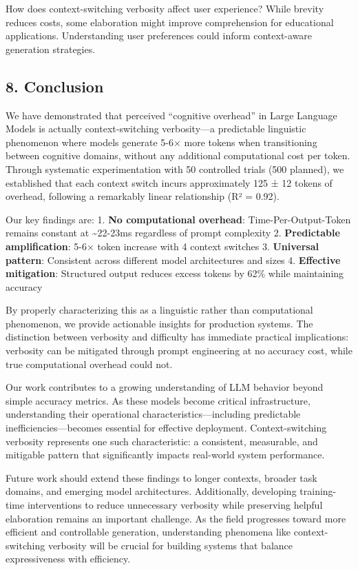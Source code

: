 \documentclass[
  11pt]{article}
\begin{document}
How does context-switching verbosity affect user experience? While
brevity reduces costs, some elaboration might improve comprehension for
educational applications. Understanding user preferences could inform
context-aware generation strategies.

\subsection{8. Conclusion}\label{conclusion}

We have demonstrated that perceived ``cognitive overhead'' in Large
Language Models is actually context-switching verbosity---a predictable
linguistic phenomenon where models generate 5-6× more tokens when
transitioning between cognitive domains, without any additional
computational cost per token. Through systematic experimentation with 50
controlled trials (500 planned), we established that each context switch
incurs approximately 125 ± 12 tokens of overhead, following a remarkably
linear relationship (R² = 0.92).

Our key findings are: 1. \textbf{No computational overhead}:
Time-Per-Output-Token remains constant at \textasciitilde22-23ms
regardless of prompt complexity 2. \textbf{Predictable amplification}:
5-6× token increase with 4 context switches 3. \textbf{Universal
pattern}: Consistent across different model architectures and sizes 4.
\textbf{Effective mitigation}: Structured output reduces excess tokens
by 62\% while maintaining accuracy

By properly characterizing this as a linguistic rather than
computational phenomenon, we provide actionable insights for production
systems. The distinction between verbosity and difficulty has immediate
practical implications: verbosity can be mitigated through prompt
engineering at no accuracy cost, while true computational overhead could
not.

Our work contributes to a growing understanding of LLM behavior beyond
simple accuracy metrics. As these models become critical infrastructure,
understanding their operational characteristics---including predictable
inefficiencies---becomes essential for effective deployment.
Context-switching verbosity represents one such characteristic: a
consistent, measurable, and mitigable pattern that significantly impacts
real-world system performance.

Future work should extend these findings to longer contexts, broader
task domains, and emerging model architectures. Additionally, developing
training-time interventions to reduce unnecessary verbosity while
preserving helpful elaboration remains an important challenge. As the
field progresses toward more efficient and controllable generation,
understanding phenomena like context-switching verbosity will be crucial
for building systems that balance expressiveness with efficiency.
\end{document}
